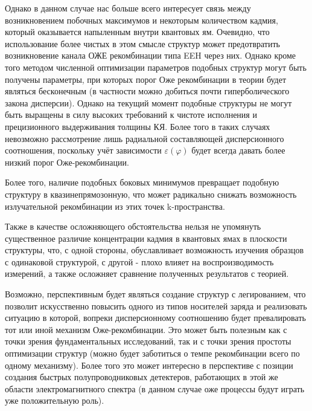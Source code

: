 \documentclass[../main.tex]{subfiles}
\begin{document}
    Однако в данном случае нас больше всего интересует связь между возникновением побочных максимумов и некоторым количеством 
    кадмия, который оказывается напыленным внутри квантовых ям. Очевидно, что использование более чистых в этом смысле структур
    может предотвратить возникновение канала ОЖЕ рекомбинации типа EEH через них. Однако кроме того методом численной оптимизации параметров 
    подобных структур могут быть получены параметры, при которых порог Оже рекомбинации в теории будет являться бесконечным (в частности можно добиться почти 
    гиперболического закона дисперсии). Однако на текущий момент подобные структуры не могут быть выращены в силу высоких требований к чистоте исполнения и 
    прецизионного выдерживания толщины КЯ. Более того в таких случаях невозможно рассмотрение лишь радиальной составляющей дисперсионного соотношения,
    поскольку учёт зависимости $\varepsilon(\varphi)$ будет всегда давать более низкий порог Оже-рекомбинации.

    Более того, наличие подобных боковых минимумов превращает подобную структуру в квазинепрямозонную, что может радикально снижать возможность излучательной 
    рекомбинации из этих точек k-пространства. 

    Также в качестве осложняющего обстоятельства нельзя не упомянуть существенное различие концентрации кадмия в квантовых ямах в плоскости структуры,
    что, с одной стороны, обуславливает возможность изучения образцов с одинаковой структурой, с другой - плохо влияет на воспроизводимость измерений,
    а также осложняет сравнение полученных результатов с теорией.

    Возможно, перспективным будет являться создание структур с легированием, что позволит искусственно повысить одного из типов носителей заряда и реализовать 
    ситуацию в которой, вопреки дисперсионному соотношению будет превалировать тот или иной механизм Оже-рекомбинации. Это может быть полезным как с точки зрения 
    фундаментальных исследований, так и с точки зрения простоты оптимизации структур (можно будет заботиться о темпе рекомбинации всего по одному механизму). 
    Более того это может интересно в перспективе с позиции создания быстрых полупроводниковых детектеров, работающих в этой же области электромагнитного спектра 
    (в данном случае оже процессы будут играть уже положительную роль).
    
\end{document}
